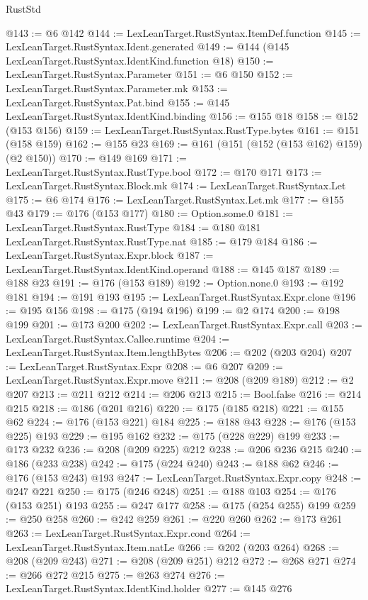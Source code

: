 \begin{lexlean}{RustStd}
\begin{coremodule}
@143 := @6 @142
@144 := LexLeanTarget.RustSyntax.ItemDef.function
@145 := LexLeanTarget.RustSyntax.Ident.generated
@149 := @144 (@145 LexLeanTarget.RustSyntax.IdentKind.function @18)
@150 := LexLeanTarget.RustSyntax.Parameter
@151 := @6 @150
@152 := LexLeanTarget.RustSyntax.Parameter.mk
@153 := LexLeanTarget.RustSyntax.Pat.bind
@155 := @145 LexLeanTarget.RustSyntax.IdentKind.binding
@156 := @155 @18
@158 := @152 (@153 @156)
@159 := LexLeanTarget.RustSyntax.RustType.bytes
@161 := @151 (@158 @159)
@162 := @155 @23
@169 := @161 (@151 (@152 (@153 @162) @159) (@2 @150))
@170 := @149 @169
@171 := LexLeanTarget.RustSyntax.RustType.bool
@172 := @170 @171
@173 := LexLeanTarget.RustSyntax.Block.mk
@174 := LexLeanTarget.RustSyntax.Let
@175 := @6 @174
@176 := LexLeanTarget.RustSyntax.Let.mk
@177 := @155 @43
@179 := @176 (@153 @177)
@180 := Option.some.{0}
@181 := LexLeanTarget.RustSyntax.RustType
@184 := @180 @181 LexLeanTarget.RustSyntax.RustType.nat
@185 := @179 @184
@186 := LexLeanTarget.RustSyntax.Expr.block
@187 := LexLeanTarget.RustSyntax.IdentKind.operand
@188 := @145 @187
@189 := @188 @23
@191 := @176 (@153 @189)
@192 := Option.none.{0}
@193 := @192 @181
@194 := @191 @193
@195 := LexLeanTarget.RustSyntax.Expr.clone
@196 := @195 @156
@198 := @175 (@194 @196)
@199 := @2 @174
@200 := @198 @199
@201 := @173 @200
@202 := LexLeanTarget.RustSyntax.Expr.call
@203 := LexLeanTarget.RustSyntax.Callee.runtime
@204 := LexLeanTarget.RustSyntax.Item.lengthBytes
@206 := @202 (@203 @204)
@207 := LexLeanTarget.RustSyntax.Expr
@208 := @6 @207
@209 := LexLeanTarget.RustSyntax.Expr.move
@211 := @208 (@209 @189)
@212 := @2 @207
@213 := @211 @212
@214 := @206 @213
@215 := Bool.false
@216 := @214 @215
@218 := @186 (@201 @216)
@220 := @175 (@185 @218)
@221 := @155 @62
@224 := @176 (@153 @221) @184
@225 := @188 @43
@228 := @176 (@153 @225) @193
@229 := @195 @162
@232 := @175 (@228 @229) @199
@233 := @173 @232
@236 := @208 (@209 @225) @212
@238 := @206 @236 @215
@240 := @186 (@233 @238)
@242 := @175 (@224 @240)
@243 := @188 @62
@246 := @176 (@153 @243) @193
@247 := LexLeanTarget.RustSyntax.Expr.copy
@248 := @247 @221
@250 := @175 (@246 @248)
@251 := @188 @103
@254 := @176 (@153 @251) @193
@255 := @247 @177
@258 := @175 (@254 @255) @199
@259 := @250 @258
@260 := @242 @259
@261 := @220 @260
@262 := @173 @261
@263 := LexLeanTarget.RustSyntax.Expr.cond
@264 := LexLeanTarget.RustSyntax.Item.natLe
@266 := @202 (@203 @264)
@268 := @208 (@209 @243)
@271 := @208 (@209 @251) @212
@272 := @268 @271
@274 := @266 @272 @215
@275 := @263 @274
@276 := LexLeanTarget.RustSyntax.IdentKind.holder
@277 := @145 @276

\end{coremodule}
\end{lexlean}
